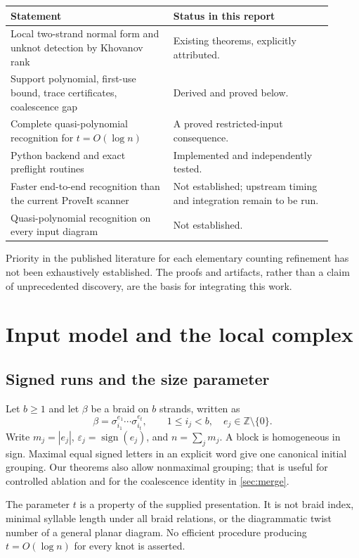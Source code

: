 \documentclass[11pt,letterpaper]{article}
\theoremstyle{definition}
\newcommand{\Z}{\mathbb Z}
\newcommand{\eps}{\varepsilon}
\begin{document}
\begin{center}
\small
\begin{tabular}{p{0.46\linewidth}p{0.45\linewidth}}
\toprule
Statement & Status in this report\\
\midrule
Local two-strand normal form and unknot detection by Khovanov rank & Existing theorems, explicitly attributed.\\
Support polynomial, first-use bound, trace certificates, coalescence gap & Derived and proved below.\\
Complete quasi-polynomial recognition for \(t=O(\log n)\) & A proved restricted-input consequence.\\
Python backend and exact preflight routines & Implemented and independently tested.\\
Faster end-to-end recognition than the current ProveIt scanner & Not established; upstream timing and integration remain to be run.\\
Quasi-polynomial recognition on every input diagram & Not established.\\
\bottomrule
\end{tabular}
\end{center}
Priority in the published literature for each elementary counting refinement has not been exhaustively established. The proofs and artifacts, rather than a claim of unprecedented discovery, are the basis for integrating this work.

\section{Input model and the local complex}\label{sec:local}
\subsection{Signed runs and the size parameter}
Let \(b\geq1\) and let \(\beta\) be a braid on \(b\) strands, written as
\begin{equation}\label{eq:braid}
 \beta=\sigma_{i_1}^{e_1}\cdots\sigma_{i_t}^{e_t},
 \qquad 1\leq i_j<b,\quad e_j\in\Z\setminus\{0\}.
\end{equation}
Write \(m_j=|e_j|\), \(\eps_j=\operatorname{sign}(e_j)\), and
\(n=\sum_jm_j\). A block is homogeneous in sign. Maximal equal signed letters in an explicit word give one canonical initial grouping. Our theorems also allow nonmaximal grouping; that is useful for controlled ablation and for the coalescence identity in \cref{sec:merge}.

The parameter \(t\) is a property of the supplied presentation. It is not braid index, minimal syllable length under all braid relations, or the diagrammatic twist number of a general planar diagram. No efficient procedure producing \(t=O(\log n)\) for every knot is asserted.
\end{document}
